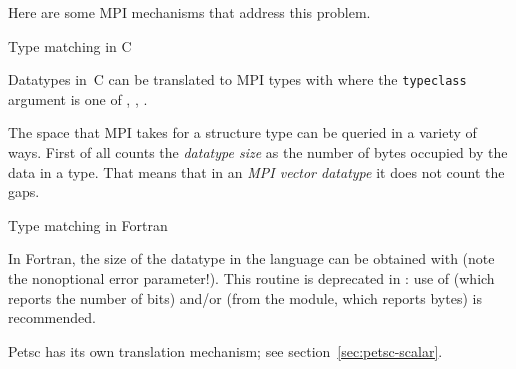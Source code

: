 Here are some MPI mechanisms that address this problem.

 {Type matching in C}
\label{sec:mpi-type-match-c}

Datatypes in~C can be translated to MPI types with
%
%
where the \lstinline{typeclass} argument is one of
,
,
.


The space that MPI takes for a structure type can be queried in a
variety of ways. First of all  counts the
\emph{datatype size} as the 
number of bytes occupied by the data in a type. That means that in an
\emph{MPI vector datatype} it does not
count the gaps.
%

\begin{comment}
In C, the \indexmpidef{MPI_Datatype} type is defined through the pre-processor,
allowing you to write:
\cverbatimsnippet{datatypevar}
\end{comment}

 {Type matching in Fortran}
\label{sec:mpi-type-match-f}

In Fortran, the size of the datatype in the language can be obtained with
 (note the nonoptional error parameter!).
This routine is deprecated in :
use of
 (which reports the number of bits)
and/or 
(from the  module, which reports bytes)
is recommended.


Petsc has its own translation mechanism; see section~\ref{sec:petsc-scalar}.


